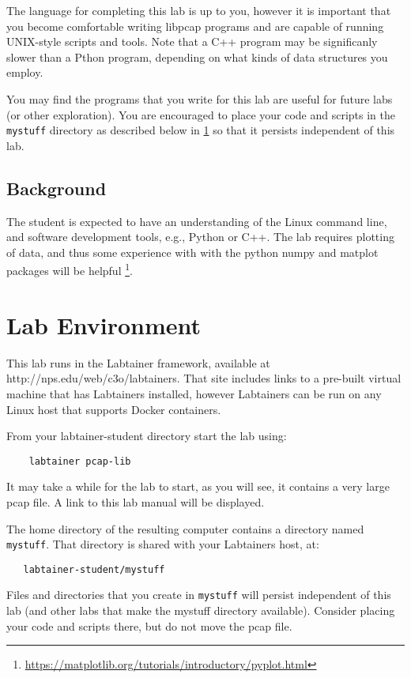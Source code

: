 The language for completing this lab is up to you, however it is important that you become comfortable writing libpcap programs and are capable of running UNIX-style scripts and tools.  Note that a C++ program may be significanly slower
than a Pthon program, depending on what kinds of data structures you employ.

You may find the programs that you write for this lab are useful for future labs (or other exploration).  You are encouraged to place your code and scripts
in the {\tt mystuff} directory as described below in \ref{environment} so that it persists independent of this lab.

\subsection {Background}
The student is expected to have an understanding of the Linux command line, and software development tools, e.g., Python or C++.
The lab requires plotting of data, and thus some experience with with the python numpy and matplot packages will be helpful \footnote{\url{https://matplotlib.org/tutorials/introductory/pyplot.html}}.

\section{Lab Environment}
\label{environment}
This lab runs in the Labtainer framework,
available at http://nps.edu/web/c3o/labtainers.
That site includes links to a pre-built virtual machine
that has Labtainers installed, however Labtainers can
be run on any Linux host that supports Docker containers.

From your labtainer-student directory start the lab using:
\begin{verbatim}
    labtainer pcap-lib
\end{verbatim}
\noindent It may take a while for the lab to start, as you will see, it contains a very large pcap file. 
A link to this lab manual will be displayed.  

The home directory of the resulting computer contains a directory named {\tt mystuff}.  That directory is shared with your Labtainers host,
at:
\begin{verbatim}
   labtainer-student/mystuff
\end{verbatim}
\noindent Files and directories that you create in {\tt mystuff} will persist independent of this lab (and other labs that make the mystuff
directory available).  Consider placing your code and scripts there, but do not move the pcap file.


